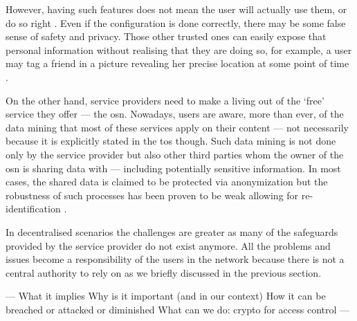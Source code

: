 \documentclass[showtrims,oldfontcommands]{kthesis}
\begin{document}
However, having such features does not mean the user will actually use them, or   
do so right \cite{KrishnamurthyW08, BrandtzaegLS10}. Even if the configuration is 
done correctly, there may be some false sense of safety and privacy. Those other 
trusted ones can easily expose that personal information without realising that 
they are doing so, for example, a user may tag a friend in a picture revealing her 
precise location at some point of time \cite{ZhelevaG09}. 

On the other hand, service providers need to make a living out of the `free' service
they offer --- the \ac{osn}. Nowadays, users are aware, more than ever, of the data 
mining that most of these services apply on their content --- not necessarily because 
it is explicitly stated in the \ac{tos} though. Such data mining is not done only 
by the service provider but also other third parties whom the owner of the \ac{osn} 
is sharing data with --- including potentially sensitive information. In most cases, 
the shared data is claimed to be protected via anonymization but the robustness 
of such processes has been proven to be weak allowing for re-identification \cite{NarayananS09}.

In decentralised scenarios the challenges are greater as many of the safeguards 
provided by the service provider do not exist anymore. All the problems and issues 
become a responsibility of the users in the network because there is not a central 
authority to rely on as we briefly discussed in the previous section.



---
What it implies
Why is it important (and in our context)
How it can be breached or attacked or diminished
What can we do: crypto for access control
---

%
%
%
\end{document}
